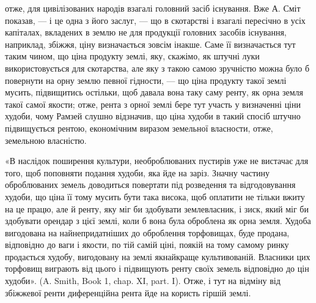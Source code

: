 \parcont{}  %
отже, для цивілізованих народів взагалі головний засіб існування. Вже А. Сміт
показав, — і це одна з його заслуг, — що в скотарстві і взагалі пересічно в
усіх капіталах, вкладених в землю не для продукції головних засобів існування,
наприклад, збіжжя, ціну визначається зовсім інакше. Саме її визначається
тут таким чином, що ціна продукту землі, яку, скажімо, як штучні луки використовується
для скотарства, але яку з такою самою зручністю можна було б
повернути на орну землю певної гідности, — що ціна продукту такої землі мусить,
підвищитись остільки, щоб давала вона таку саму ренту, як орна земля такої
самої якости; отже, рента з орної землі бере тут участь у визначенні ціни худоби,
чому Рамзей слушно відзначив, що ціна худоби в такий спосіб штучно
підвищується рентою, економічним виразом земельної власности, отже, земельною
власністю.

«В наслідок поширення культури, необроблюваних пустирів уже не вистачає
для того, щоб поповняти подання худоби, яка йде на заріз. Значну частину
оброблюваних земель доводиться повертати під розведення та відгодовування
худоби, що ціна її тому мусить бути така висока, щоб оплатити не
тільки вжиту на це працю, але й ренту, яку міг би здобувати землевласник,
і зиск, який міг би здобувати орендар з цієї землі, коли б вона була
оброблена як орна земля. Худоба вигодована на найнепридатніших до оброблення
торфовищах, буде продана, відповідно до ваги і якости, по тій самій ціні, поякій
на тому самому ринку продається худобу, вигодовану на землі якнайкраще
культивованій. Власники цих торфовищ виграють від цього і підвищують ренту
своїх земель відповідно до цін худоби». (A. Smith, Book 1, chap. XI, part. I).
Отже, і тут на відміну від збіжжевої ренти диференційна рента йде на користь
гіршій землі.

